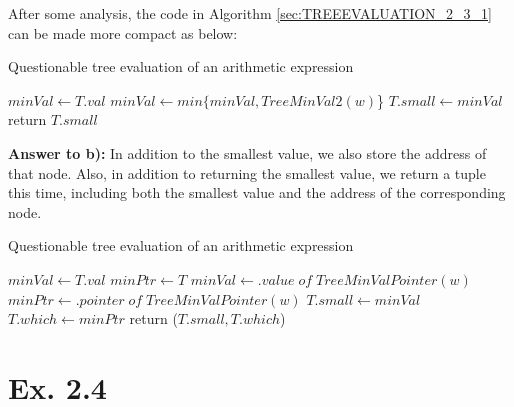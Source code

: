 \documentclass[a4paper,11pt]{article}
\theoremstyle{mytheor}
\begin{document}
After some analysis, the code in Algorithm \ref{sec:TREEEVALUATION_2_3_1} can be made more compact as below:

\begin{algorithm}[H]
\caption{Questionable tree evaluation of an arithmetic expression}\label{sec:TREEEVALUATION_2_3_2}
\begin{algorithmic}[1]
  \State $minVal \gets T.val$
    \State $minVal \gets min\{minVal, TreeMinVal2(w)$\} 
  \EndFor
  \State $T.small \gets minVal$
  \State return $T.small$
\EndFunction
\end{algorithmic}
\end{algorithm}

\vspace{1.2in}

\noindent\textbf{Answer to b):} In addition to the smallest value, we also store the address of that node. Also, in addition to returning the smallest value, we return a tuple this time, including both the smallest value and the address of the corresponding node.

\begin{algorithm}[H]
\caption{Questionable tree evaluation of an arithmetic expression}\label{sec:TREEEVALUATION_2_3_b}
\begin{algorithmic}[1]
  \State $minVal \gets T.val$
  \State $minPtr \gets T$
      \State $minVal \gets .value\;of\;TreeMinValPointer(w)$
      \State $minPtr \gets .pointer\;of\;TreeMinValPointer(w)$
    \EndIf
  \EndFor
  \State $T.small \gets minVal$
  \State $T.which \gets minPtr$
  \State return ($T.small, T.which$)   
\EndFunction
\end{algorithmic}
\end{algorithm}

\vspace{1.2in}

\section*{Ex. 2.4}
\end{document}
